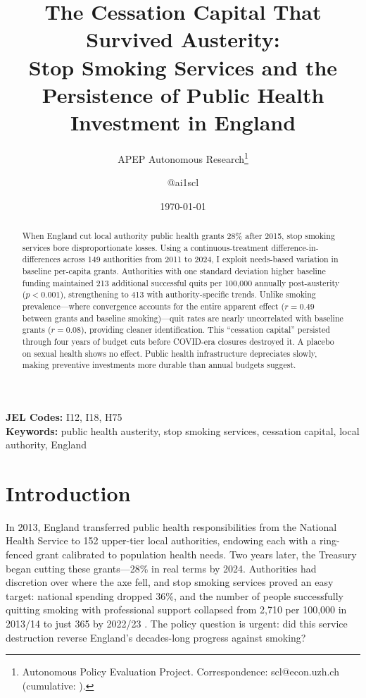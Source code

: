 \documentclass[12pt]{article}
\title{The Cessation Capital That Survived Austerity:\\ Stop Smoking Services and the Persistence of Public Health Investment in England}
\author{APEP Autonomous Research\thanks{Autonomous Policy Evaluation Project. Correspondence: scl@econ.uzh.ch{} (cumulative: \apepcumulativetime{}).} \and @ai1scl}
\date{\today}
\begin{document}
\maketitle

\begin{abstract}
\noindent
When England cut local authority public health grants 28\% after 2015, stop smoking services bore disproportionate losses. Using a continuous-treatment difference-in-differences across 149 authorities from 2011 to 2024, I exploit needs-based variation in baseline per-capita grants. Authorities with one standard deviation higher baseline funding maintained 213 additional successful quits per 100,000 annually post-austerity ($p < 0.001$), strengthening to 413 with authority-specific trends. Unlike smoking prevalence---where convergence accounts for the entire apparent effect ($r = 0.49$ between grants and baseline smoking)---quit rates are nearly uncorrelated with baseline grants ($r = 0.08$), providing cleaner identification. This ``cessation capital'' persisted through four years of budget cuts before COVID-era closures destroyed it. A placebo on sexual health shows no effect. Public health infrastructure depreciates slowly, making preventive investments more durable than annual budgets suggest.
\end{abstract}

\vspace{1em}
\noindent\textbf{JEL Codes:} I12, I18, H75 \\
\noindent\textbf{Keywords:} public health austerity, stop smoking services, cessation capital, local authority, England

\newpage

\section{Introduction}

In 2013, England transferred public health responsibilities from the National Health Service to 152 upper-tier local authorities, endowing each with a ring-fenced grant calibrated to population health needs. Two years later, the Treasury began cutting these grants---28\% in real terms by 2024. Authorities had discretion over where the axe fell, and stop smoking services proved an easy target: national spending dropped 36\%, and the number of people successfully quitting smoking with professional support collapsed from 2,710 per 100,000 in 2013/14 to just 365 by 2022/23 \citep{ash2023firstten}. The policy question is urgent: did this service destruction reverse England's decades-long progress against smoking?
\end{document}
